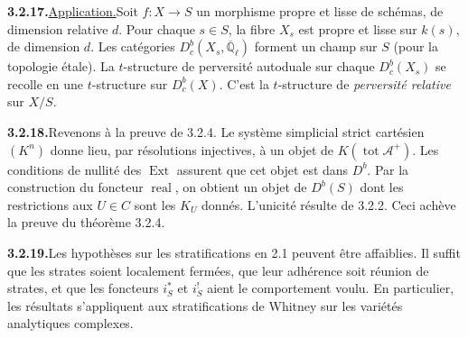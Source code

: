 \documentclass[12pt,a4paper]{article}
\theoremstyle{plain}
\theoremstyle{definition}
\DeclareMathOperator{\Ext}{Ext}
\DeclareMathOperator{\real}{real}
\DeclareMathOperator{\tot}{tot}
\begin{document}
\smallskip
\noindent\textbf{3.2.17.}\quad \underline{Application.}\quad Soit $f : X \to S$ un morphisme propre et lisse de sch\'emas, de dimension relative $d$. Pour chaque $s \in S$, la fibre $X_s$ est propre et lisse sur $k(s)$, de dimension $d$. Les cat\'egories $D_c^b(X_s, \overline{\mathbb{Q}}_\ell)$ forment un champ sur $S$ (pour la topologie \'etale). La $t$-structure de perversit\'e autoduale sur chaque $D_c^b(X_s)$ se recolle en une $t$-structure sur $D_c^b(X)$. C'est la $t$-structure de \emph{perversit\'e relative} sur $X/S$.

\smallskip
\noindent\textbf{3.2.18.}\quad Revenons \`a la preuve de 3.2.4. Le syst\`eme simplicial strict cart\'esien $(K^n)$ donne lieu, par r\'esolutions injectives, \`a un objet de $K(\tot \mathcal{A}^+)$. Les conditions de nullit\'e des $\Ext$ assurent que cet objet est dans $D^b$. Par la construction du foncteur $\real$, on obtient un objet de $D^b(S)$ dont les restrictions aux $U \in C$ sont les $K_U$ donn\'es. L'unicit\'e r\'esulte de 3.2.2. Ceci ach\`eve la preuve du th\'eor\`eme 3.2.4.

\smallskip
\noindent\textbf{3.2.19.}\quad Les hypoth\`eses sur les stratifications en 2.1 peuvent \^etre affaiblies. Il suffit que les strates soient localement ferm\'ees, que leur adh\'erence soit r\'eunion de strates, et que les foncteurs $i_S^*$ et $i_S^!$ aient le comportement voulu. En particulier, les r\'esultats s'appliquent aux stratifications de Whitney sur les vari\'et\'es analytiques complexes.
\end{document}
